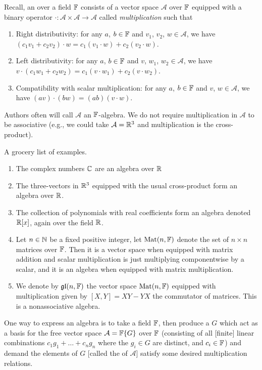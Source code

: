 \M
Recall, an  over a field $\mathbb{F}$ consists of a vector
space $\mathcal{A}$ over $\mathbb{F}$ equipped with a binary operator
$\cdot\colon\mathcal{A}\times\mathcal{A}\to\mathcal{A}$ called
\emph{multiplication} such that
\begin{enumerate}
\item Right distributivity: for any $a$, $b\in\mathbb{F}$ and $v_{1}$, $v_{2}$, $w\in\mathcal{A}$,
  we have $(c_{1}v_{1}+c_{2}v_{2})\cdot w = c_{1}(v_{1}\cdot w) + c_{2}(v_{2}\cdot w)$.
\item Left distributivity: for any $a$, $b\in\mathbb{F}$ and $v$, $w_{1}$, $w_{2}\in\mathcal{A}$,
  we have $v\cdot(c_{1}w_{1}+c_{2}w_{2}) = c_{1}(v\cdot w_{1}) + c_{2}(v\cdot w_{2})$.
\item Compatibility with scalar multiplication:
  for any $a$, $b\in\mathbb{F}$ and $v$, $w\in\mathcal{A}$, we have
  $(av)\cdot(bw) = (ab)(v\cdot w)$.
\end{enumerate}
Authors often will call $\mathcal{A}$ an $\mathbb{F}$-algebra. We do not
require multiplication in $\mathcal{A}$ to be associative (e.g., we
could take $\mathcal{A}=\mathbb{R}^{3}$ and multiplication is the cross-product).

\begin{example}
  A grocery list of examples.
  \begin{enumerate}
  \item The complex numbers $\mathbb{C}$ are an algebra over $\mathbb{R}$
  \item The three-vectors in $\mathbb{R}^{3}$ equipped with the usual
    cross-product form an algebra over $\mathbb{R}$.
  \item The collection of polynomials with real coefficients form an
    algebra denoted $\mathbb{R}[x]$, again over the field $\mathbb{R}$.
  \item Let $n\in\mathbb{N}$ be a fixed positive integer, let $\operatorname{Mat}(n,\mathbb{F})$
    denote the set of $n\times n$ matrices over $\mathbb{F}$. Then it is a
    vector space when equipped with matrix addition and scalar
    multiplication is just multiplying componentwise by a scalar, and it
    is an algebra when equipped with matrix multiplication.
  \item We denote by $\operatorname{\mathfrak{gl}}(n,\mathbb{F})$ the vector space $\operatorname{Mat}(n,\mathbb{F})$
    equipped with multiplication given by $[X,Y]=XY-YX$ the commutator
    of matrices. This is a nonassociative algebra.
  \end{enumerate}
\end{example}

One way to express an algebra is to take a field $\mathbb{F}$, then produce a
 $G$ which act as a basis for the free vector
space $\mathcal{A}=\mathbb{F}\{G\}$ over $\mathbb{F}$ (consisting of all [finite] linear combinations
$c_{1}g_{1}+\dots+c_{n}g_{n}$ where the $g_{i}\in G$ are distinct, and
$c_{i}\in\mathbb{F}$) and demand the elements of $G$ [called the 
  of $\mathcal{A}$] satisfy some desired multiplication relations.

